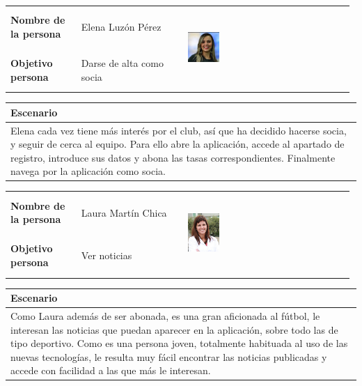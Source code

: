 \documentclass[11pt]{article}
\begin{document}
\begin{table}[H]
  \centering
  \begin{tabular}{p{0.2\linewidth}|p{0.3\linewidth}p{0.475\linewidth}}
    \toprule
    \textbf{Nombre de la persona} & Elena Luzón Pérez &\multirow{2}{*}{\begin{minipage}{1.\textwidth}\includegraphics[width=0.2\textwidth, height=30mm]{Elena}\end{minipage}}\\
    \textbf{Objetivo persona} & Darse de alta como socia & \\
    \bottomrule
  \end{tabular}

\begin{tabular}{p{1.028\linewidth}}
  \textbf{Escenario}\\
  \midrule
  Elena cada vez tiene más interés por el club, así que ha decidido hacerse socia, y seguir de cerca al equipo. Para ello abre la aplicación, accede al apartado de registro, introduce sus datos y abona las tasas correspondientes. Finalmente navega por la aplicación como socia. 
\end{tabular}
\end{table}

\begin{table}[H]
  \centering
  \begin{tabular}{p{0.2\linewidth}|p{0.3\linewidth}p{0.475\linewidth}}
    \toprule
    \textbf{Nombre de la persona} & Laura Martín Chica &\multirow{2}{*}{\begin{minipage}{1.\textwidth}\includegraphics[width=0.2\textwidth, height=30mm]{Ana}\end{minipage}}\\
    \textbf{Objetivo persona} & Ver noticias & \\
    \bottomrule
  \end{tabular}

\begin{tabular}{p{1.028\linewidth}}
  \textbf{Escenario}\\
  \midrule
  Como Laura además de ser abonada, es una gran aficionada al fútbol, le interesan las noticias que puedan aparecer en la aplicación, sobre todo las de tipo deportivo. Como es una persona joven, totalmente habituada al uso de las nuevas tecnologías, le resulta muy fácil encontrar las noticias publicadas y accede con facilidad a las que más le interesan.
\end{tabular}
\end{table}
\end{document}
